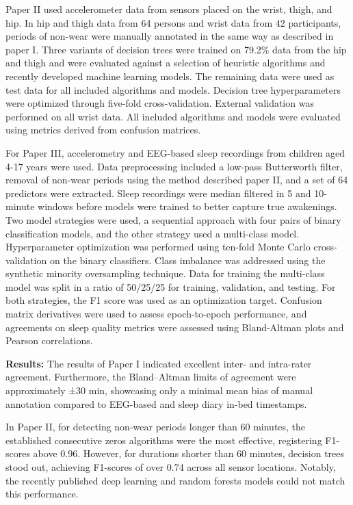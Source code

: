 \documentclass[
  10pt,
]{scrbook}
\let\originaltextbf\textbf
\renewcommand{\textbf}[1]{\textcolor{color1}{\textsf{\originaltextbf{#1}}}}
\begin{document}
Paper II used accelerometer data from sensors placed on the wrist,
thigh, and hip. In hip and thigh data from 64 persons and wrist data
from 42 participants, periods of non-wear were manually annotated in the
same way as described in paper I. Three variants of decision trees were
trained on 79.2\% data from the hip and thigh and were evaluated against
a selection of heuristic algorithms and recently developed machine
learning models. The remaining data were used as test data for all
included algorithms and models. Decision tree hyperparameters were
optimized through five-fold cross-validation. External validation was
performed on all wrist data. All included algorithms and models were
evaluated using metrics derived from confusion matrices.

For Paper III, accelerometry and EEG-based sleep recordings from
children aged 4-17 years were used. Data preprocessing included a
low-pass Butterworth filter, removal of non-wear periods using the
method described paper II, and a set of 64 predictors were extracted.
Sleep recordings were median filtered in 5 and 10-minute windows before
models were trained to better capture true awakenings. Two model
strategies were used, a sequential approach with four pairs of binary
classification models, and the other strategy used a multi-class model.
Hyperparameter optimization was performed using ten-fold Monte Carlo
cross-validation on the binary classifiers. Class imbalance was
addressed using the synthetic minority oversampling technique. Data for
training the multi-class model was split in a ratio of 50/25/25 for
training, validation, and testing. For both strategies, the F1 score was
used as an optimization target. Confusion matrix derivatives were used
to assess epoch-to-epoch performance, and agreements on sleep quality
metrics were assessed using Bland-Altman plots and Pearson correlations.

\textbf{Results:} The results of Paper I indicated excellent inter- and
intra-rater agreement. Furthermore, the Bland--Altman limits of
agreement were approximately ±30 min, showcasing only a minimal mean
bias of manual annotation compared to EEG-based and sleep diary in-bed
timestamps.

In Paper II, for detecting non-wear periods longer than 60 minutes, the
established consecutive zeros algorithms were the most effective,
registering F1-scores above 0.96. However, for durations shorter than 60
minutes, decision trees stood out, achieving F1-scores of over 0.74
across all sensor locations. Notably, the recently published deep
learning and random forests models could not match this performance.
\end{document}
